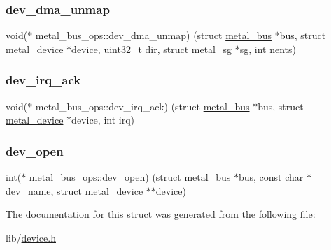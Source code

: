 \mbox{\label{structmetal__bus__ops_ab31a9a4f78412c4eae3f7e4ecb92137d}} 
\subsubsection{\texorpdfstring{dev\+\_\+dma\+\_\+unmap}{dev\_dma\_unmap}}
{\footnotesize\ttfamily void($\ast$ metal\+\_\+bus\+\_\+ops\+::dev\+\_\+dma\+\_\+unmap) (struct \hyperlink{structmetal__bus}{metal\+\_\+bus} $\ast$bus, struct \hyperlink{structmetal__device}{metal\+\_\+device} $\ast$device, uint32\+\_\+t dir, struct \hyperlink{structmetal__sg}{metal\+\_\+sg} $\ast$sg, int nents)}

\mbox{\label{structmetal__bus__ops_a421a2c69b568fa09c45738b67ec149d3}} 
\subsubsection{\texorpdfstring{dev\+\_\+irq\+\_\+ack}{dev\_irq\_ack}}
{\footnotesize\ttfamily void($\ast$ metal\+\_\+bus\+\_\+ops\+::dev\+\_\+irq\+\_\+ack) (struct \hyperlink{structmetal__bus}{metal\+\_\+bus} $\ast$bus, struct \hyperlink{structmetal__device}{metal\+\_\+device} $\ast$device, int irq)}

\mbox{\label{structmetal__bus__ops_aaa736e0c899395854728a82f1dae22fd}} 
\subsubsection{\texorpdfstring{dev\+\_\+open}{dev\_open}}
{\footnotesize\ttfamily int($\ast$ metal\+\_\+bus\+\_\+ops\+::dev\+\_\+open) (struct \hyperlink{structmetal__bus}{metal\+\_\+bus} $\ast$bus, const char $\ast$dev\+\_\+name, struct \hyperlink{structmetal__device}{metal\+\_\+device} $\ast$$\ast$device)}



The documentation for this struct was generated from the following file\+:\begin{DoxyCompactItemize}
\item 
lib/\hyperlink{device_8h}{device.\+h}\end{DoxyCompactItemize}
